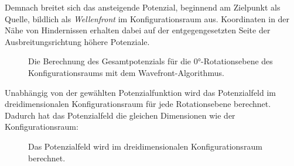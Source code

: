 \newpage
Demnach breitet sich das ansteigende Potenzial, beginnend am Zielpunkt als Quelle, bildlich als \textit{Wellenfront} im Konfigurationsraum aus. Koordinaten in der Nähe von Hindernissen erhalten dabei auf der entgegengesetzten Seite der Ausbreitungsrichtung höhere Potenziale.

\begin{figure}[H]
	\centering
	\footnotesize
	\centerline{}
	\caption{Die Berechnung des Gesamtpotenzials für die $0$°-Rotationsebene des Konfigurationsraums mit dem Wavefront-Algorithmus.}
\end{figure}

\vspace*{1cm}
Unabhängig von der gewählten Potenzialfunktion wird das Potenzialfeld im dreidimensionalen Konfigurationsraum für jede Rotationsebene berechnet.
Dadurch hat das Potenzialfeld die gleichen Dimensionen wie der Konfigurationsraum:

\begin{figure}[H]
	\centering
	\footnotesize
	\centerline{}
	\caption{Das Potenzialfeld wird im dreidimensionalen Konfigurationsraum berechnet.}
\end{figure}


